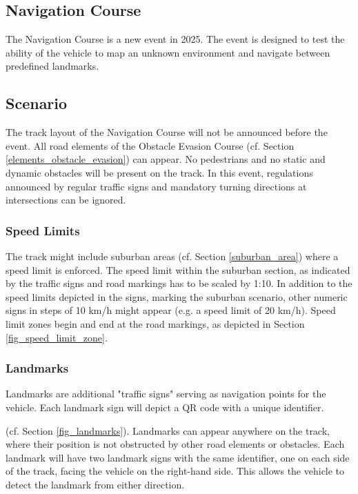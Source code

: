 
\begin{highlight}[yellow]

    \section{Navigation Course}
    \label{navigation_course}

    The Navigation Course is a new event in 2025. The event is designed to test the
    ability of the vehicle to map an unknown environment and navigate between
    predefined landmarks.

    \subsection{Scenario}

    The track layout of the Navigation Course will not be announced before the
    event. All road elements of the Obstacle Evasion Course (cf. Section
    \ref{elements_obstacle_evasion}) can appear. No pedestrians and no static and
    dynamic obstacles will be present on the track. In this event, regulations
    announced by regular traffic signs and mandatory turning directions at
    intersections can be ignored.

    \subsubsection{Speed Limits}

    The track might include suburban areas (cf. Section \ref{suburban_area}) where
    a speed limit is enforced. The speed limit within the suburban section, as
    indicated by the traffic signs and road markings has to be scaled by 1:10. In
    addition to the speed limits depicted in the signs, marking the suburban
    scenario, other numeric signs in steps of 10 km/h might appear (e.g. a speed
    limit of 20 km/h). Speed limit zones begin and end at the road markings, as
    depicted in Section \ref{fig_speed_limit_zone}.

    \subsubsection{Landmarks}
    \label{landmarks}

    Landmarks are additional "traffic signs" serving as navigation points for the
    vehicle. Each landmark sign will depict a QR code with a unique identifier.

     (cf. Section \ref{fig_landmarks}).
    Landmarks can appear anywhere on the track, where their position is not 
    obstructed by other road elements or obstacles. Each landmark will have two 
    landmark signs with the same identifier, one on each side of the track, facing 
    the vehicle on the right-hand side. This allows the vehicle to detect the 
    landmark from either direction.


\end{highlight}
